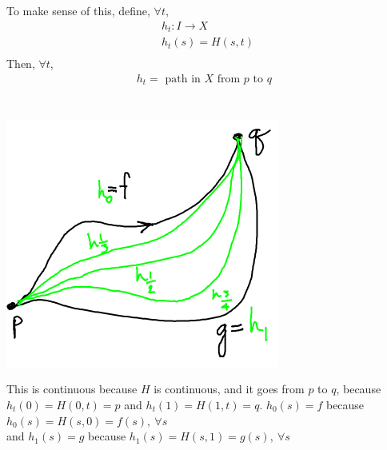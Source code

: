     \begin{itemize}
            To make sense of this, define, $\forall t$,
            \begin{align*}
                h_t: I\rightarrow X\\
                h_t(s)=H(s,t)\\
            \end{align*}
            Then, $\forall t$,
            \begin{align*}
                h_t= \text{ path in $X$ from $p$ to $q$ }\\
            \end{align*}\\
            \begin{minipage}[c]{\linewidth}
                \begin{center}
                \includegraphics[]{images/homotopy_class.png}
                \end{center}
            \end{minipage}
            This is continuous because $H$ is continuous, and it goes from $p$ to $q$, because $h_t(0)=H(0,t)=p$ and $h_t(1)=H(1,t)=q$.
            $h_0(s)=f$ because $h_0(s)=H(s,0)=f(s),\ \forall s$\\
            and $h_1(s)=g$ because $h_1(s)=H(s,1)=g(s),\ \forall s$\\
    \end{itemize}
